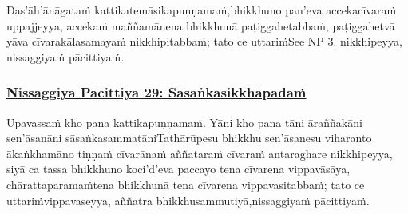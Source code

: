 {
Das'āh'ānāgataṁ kattikatemāsikapuṇṇamaṁ,\makeatletter\hyperlink{endnote215-appendix}\makeatother \thinspace bhikkhuno pan'eva accekacīvaraṁ uppajjeyya, accekaṁ maññamānena bhikkhunā paṭiggahetabbaṁ, paṭiggahetvā yāva cīvarakālasamayaṁ nikkhipitabbaṁ; tato ce uttariṁ\makeatletter\hyperlink{endnote216-appendix}\makeatother \thinspace See NP 3. nikkhipeyya, nissaggiyaṁ pācittiyaṁ.



\subsubsection*{\hyperref[forf-exp29]{Nissaggiya Pācittiya 29: Sāsaṅkasikkhāpadaṁ}}
\label{np29}

Upavassaṁ kho pana kattikapuṇṇamaṁ. Yāni kho pana tāni āraññakāni sen'āsanāni sāsaṅkasammatāni\makeatletter\hyperlink{endnote217-appendix}\makeatother \thinspace Tathārūpesu bhikkhu sen'āsanesu viharanto ākaṅkhamāno tiṇṇaṁ cīvarānaṁ aññataraṁ cīvaraṁ antaraghare nikkhipeyya, siyā ca tassa bhikkhuno koci'd'eva paccayo tena cīvarena vippavāsāya, chārattaparamaṁ\makeatletter\hyperlink{endnote218-appendix}\makeatother \thinspace tena bhikkhunā tena cīvarena vippavasitabbaṁ; tato ce uttariṁ\makeatletter\hyperlink{endnote219-appendix}\makeatother \thinspace vippavaseyya, aññatra bhikkhusammutiyā,\makeatletter\hyperlink{endnote220-appendix}\makeatother \thinspace nissaggiyaṁ pācittiyaṁ.



}
